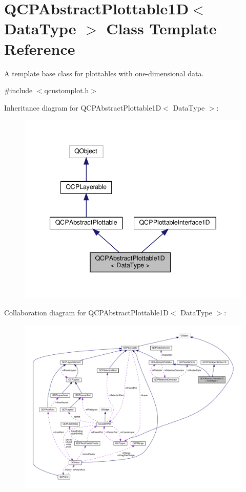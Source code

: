 \hypertarget{classQCPAbstractPlottable1D}{}\section{Q\+C\+P\+Abstract\+Plottable1D$<$ Data\+Type $>$ Class Template Reference}
\label{classQCPAbstractPlottable1D}


A template base class for plottables with one-\/dimensional data.  




{\ttfamily \#include $<$qcustomplot.\+h$>$}



Inheritance diagram for Q\+C\+P\+Abstract\+Plottable1D$<$ Data\+Type $>$\+:\nopagebreak
\begin{figure}[H]
\begin{center}
\leavevmode
\includegraphics[width=340pt]{classQCPAbstractPlottable1D__inherit__graph}
\end{center}
\end{figure}


Collaboration diagram for Q\+C\+P\+Abstract\+Plottable1D$<$ Data\+Type $>$\+:\nopagebreak
\begin{figure}[H]
\begin{center}
\leavevmode
\includegraphics[width=350pt]{classQCPAbstractPlottable1D__coll__graph}
\end{center}
\end{figure}

